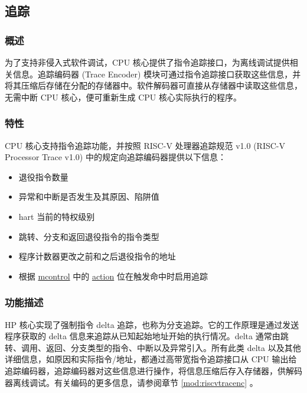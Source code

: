 \documentclass[main\_\_CN.tex]{subfiles}
\begin{document}



\newpage
\subsection{追踪}
\label{sec:riscvcpu-trace}

\subsubsection{概述}
\label{sec:riscvcpu-trace-overview}
为了支持非侵入式软件调试，CPU 核心提供了指令追踪接口，为离线调试提供相关信息。追踪编码器 (Trace Encoder) 模块可通过指令追踪接口获取这些信息，并将其压缩后存储在分配的存储器中。软件解码器可直接从存储器中读取这些信息，无需中断 CPU 核心，便可重新生成 CPU 核心实际执行的程序。


\subsubsection{特性}
\label{sec:riscvcpu-trace-features}

CPU 核心支持指令追踪功能，并按照 RISC-V 处理器追踪规范 v1.0 (RISC-V Processor Trace v1.0) 中的规定向追踪编码器提供以下信息：

\begin{itemize}
    \item 退役指令数量
    \item 异常和中断是否发生及其原因、陷阱值
    \item hart 当前的特权级别
    \item 跳转、分支和返回退役指令的指令类型
    \item 程序计数器更改之前和之后退役指令的地址
    \item 根据 \hyperref[regdesc:MCONTROL]{mcontrol} 中的 \hyperref[regdesc:MCONTROL]{action} 位在触发命中时启用追踪
\end{itemize}


\subsubsection{功能描述}
\label{sec:riscvcpu-trace-func-descr}

HP 核心实现了强制指令 delta 追踪，也称为分支追踪。它的工作原理是通过发送程序获取的 delta 信息来追踪从已知起始地址开始的执行情况。delta 通常由跳转、调用、返回、分支类型的指令、中断以及异常引入。所有此类 delta 以及其他详细信息，如原因和实际指令/地址，都通过高带宽指令追踪接口从 CPU 输出给追踪编码器，追踪编码器对这些信息进行操作，将信息压缩后存入存储器，供解码器离线调试。有关编码的更多信息，请参阅章节 \ref{mod:riscvtracenc} \textit{}。
\end{document}

